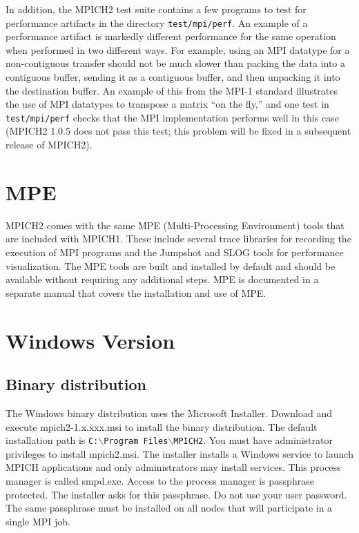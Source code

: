 \documentclass[dvipdfm,11pt]{article}
\begin{document}
In addition, the
MPICH2 test suite contains a few programs to test for performance artifacts in
the directory \texttt{test/mpi/perf}.  An example of a performance artifact is
markedly different performance for the same operation when performed in two
different ways.  For example, using an MPI datatype for a non-contiguous
transfer should not be much slower than packing the data into a contiguous
buffer, sending it as a contiguous buffer, and then unpacking it into the
destination buffer.  An example of this from the MPI-1 standard illustrates
the use of MPI datatypes to transpose a matrix ``on the fly,'' and one test in
\texttt{test/mpi/perf} checks that the MPI implementation performs well in
this case (MPICH2 1.0.5 does not pass this test; this problem will be fixed in
a subsequent release of MPICH2).

\section{MPE}
\label{sec:mpe}

MPICH2 comes with the same MPE (Multi-Processing Environment) tools that are
included with MPICH1.  These include several trace libraries for recording the
execution of MPI programs and the Jumpshot and SLOG tools for performance
visualization.  The MPE tools are built and installed by default and should be
available without requiring any additional steps.  MPE is documented in 
a separate manual that covers the installation and use of MPE.

\section{Windows Version}
\label{sec:windows}

\subsection{Binary distribution}
\label{sec:winbin}

The Windows binary distribution uses the Microsoft Installer.  Download and 
execute mpich2-1.x.xxx.msi to install the binary distribution.  The default 
installation path is \texttt{C:$\backslash$Program Files$\backslash$MPICH2}. 
You must have administrator privileges to install mpich2.msi.  The installer 
installs a Windows service to launch MPICH applications and only administrators
may install services.  This process manager is called smpd.exe.  Access to 
the process manager is passphrase protected.  The installer asks for this 
passphrase.  Do not use your user password.  The same passphrase must be 
installed on all nodes that will participate in a single MPI job.
\end{document}
